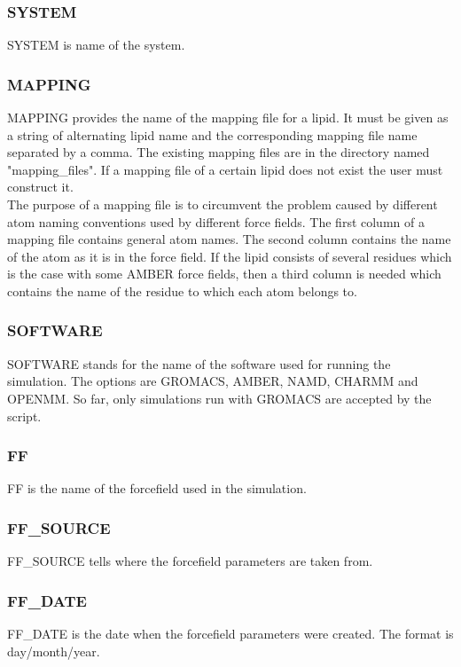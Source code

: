 \documentclass[12pt,a4paper]{article}
\begin{document}
\subsubsection*{SYSTEM}
SYSTEM is name of the system.

\subsubsection*{MAPPING}
MAPPING provides the name of the mapping file for a lipid. It must be given as a string of alternating lipid name and the corresponding mapping file name separated by a comma. The existing mapping files are in the directory named "mapping\_files". If a mapping file of a certain lipid does not exist the user must construct it.
\newline \\
The purpose of a mapping file is to circumvent the problem caused by different atom naming conventions used by different force fields. The first column of a mapping file contains general atom names. The second column contains the name of the atom as it is in the force field. If the lipid consists of several residues which is the case with some AMBER force fields, then a third column is needed which contains the name of the residue to which each atom belongs to.

\subsubsection*{SOFTWARE}
SOFTWARE stands for the name of the software used for running the simulation. The options are GROMACS, AMBER, NAMD, CHARMM and OPENMM. So far, only simulations run with GROMACS are accepted by the script.
 
\subsubsection*{FF}
FF is the name of the forcefield used in the simulation.
\subsubsection*{FF\_SOURCE}
FF\_SOURCE tells where the forcefield parameters are taken from.
\subsubsection*{FF\_DATE}
FF\_DATE is the date when the forcefield parameters were created. The format is day/month/year.
\end{document}
